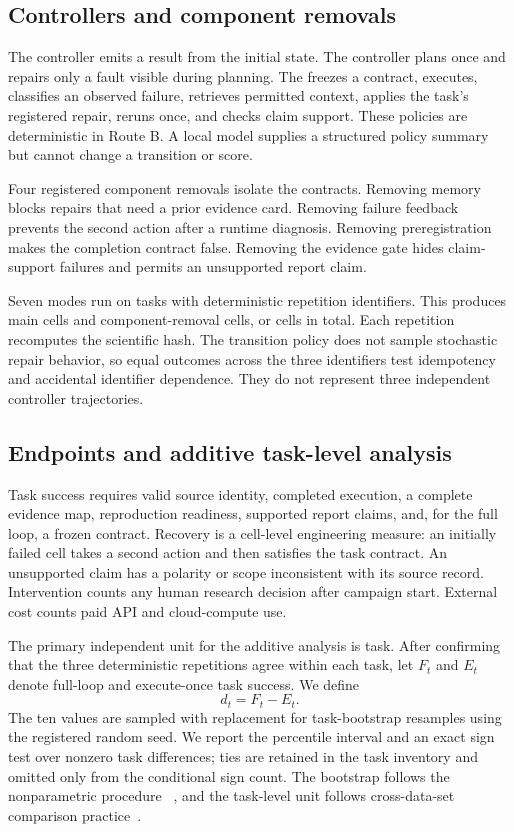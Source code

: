 \subsection{Controllers and component removals}

The \oneshot{} controller emits a result from the initial state. The
\executeonce{} controller plans once and repairs only a fault visible during
planning. The \systemloop{} freezes a contract, executes, classifies an
observed failure, retrieves permitted \vault{} context, applies the task's
registered repair, reruns once, and checks claim support. These policies are
deterministic in Route B. A local model supplies a structured policy summary
but cannot change a transition or score.

Four registered component removals isolate the contracts. Removing \vault{}
memory blocks repairs that need a prior evidence card. Removing failure
feedback prevents the second action after a runtime diagnosis. Removing
preregistration makes the completion contract false. Removing the evidence
gate hides claim-support failures and permits an unsupported report claim.

Seven modes run on \TaskCount{} tasks with \IdempotencyRepeatCount{}
deterministic repetition identifiers. This produces \MainCellCount{} main
cells and \AblationCellCount{} component-removal cells, or \CellCount{} cells
in total. Each repetition recomputes the scientific hash. The transition
policy does not sample stochastic repair behavior, so equal outcomes across
the three identifiers test idempotency and accidental identifier dependence.
They do not represent three independent controller trajectories.

\subsection{Endpoints and additive task-level analysis}

Task success requires valid source identity, completed execution, a complete
evidence map, reproduction readiness, supported report claims, and, for the
full loop, a frozen contract. Recovery is a cell-level engineering measure:
an initially failed cell takes a second action and then satisfies the task
contract. An unsupported claim has a polarity or scope inconsistent with its
source record. Intervention counts any human research decision after campaign
start. External cost counts paid API and cloud-compute use.

The primary independent unit for the additive analysis is task. After
confirming that the three deterministic repetitions agree within each task,
let \(F_t\) and \(E_t\) denote full-loop and execute-once task success. We
define
\[
d_t=F_t-E_t.
\]
The ten values are sampled with replacement for \BootstrapResamples{}
task-bootstrap resamples using the registered random seed. We report the
percentile interval and an exact sign test over nonzero task differences;
ties are retained in the task inventory and omitted only from the conditional
sign count. The bootstrap follows the nonparametric procedure
~\cite{efron1979bootstrap}, and the task-level unit follows cross-data-set
comparison practice~\cite{demsar2006}.

